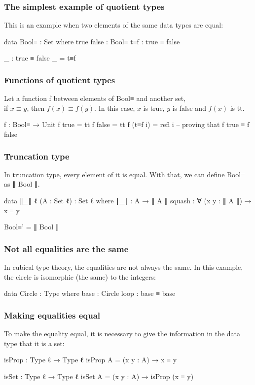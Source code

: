 \documentclass{beamer}
\begin{document}
\begin{frame}
  \frametitle{The simplest example of quotient types}
  This is an example when two elements of the same data types are equal:
  \begin{code}
  data Bool≡ : Set where
    true false : Bool≡
    t≡f : true ≡ false

  _ : true ≡ false
  _ = t≡f
  \end{code}
\end{frame}

\begin{frame}
  \frametitle{Functions of quotient types}
  Let a function f between elements of Bool≡ and another set, \\
  if $ x \equiv y $, then $ f(x) \equiv f(y) $.
  In this case, $ x $ is true, $ y $ is false and $ f(x) $ is tt.
  \begin{code}
  f : Bool≡ → Unit
  f true    = tt
  f false   = tt
  f (t≡f i) = refl i -- proving that f true ≡ f false

  \end{code}

\end{frame}

\begin{frame}
  \frametitle{Truncation type}

  In truncation type, every element of it is equal.
  With that, we can define Bool≡ as ∥ Bool ∥.

  \begin{code}
  data ∥_∥ {ℓ} (A : Set ℓ) : Set ℓ where
    ∣_∣ : A → ∥ A ∥
    squash : ∀ (x y : ∥ A ∥) → x ≡ y

  Bool≡' = ∥ Bool ∥
  \end{code}
\end{frame}

\begin{frame}
  \frametitle{Not all equalities are the same}
  In cubical type theory, the equalities are not always the same.
  In this example, the circle is isomorphic (the same) to the integers:
  \begin{code}
  data Circle : Type where
    base : Circle
    loop : base ≡ base
  \end{code}
\end{frame}

\begin{frame}
  \frametitle{Making equalities equal}
  To make the equality equal, it is necessary to give the information in the data type that it is a set:
  \begin{code}
  isProp : Type ℓ → Type ℓ
  isProp A = (x y : A) → x ≡ y

  isSet : Type ℓ → Type ℓ
  isSet A = (x y : A) → isProp (x ≡ y)
  \end{code}
\end{frame}
\end{document}
